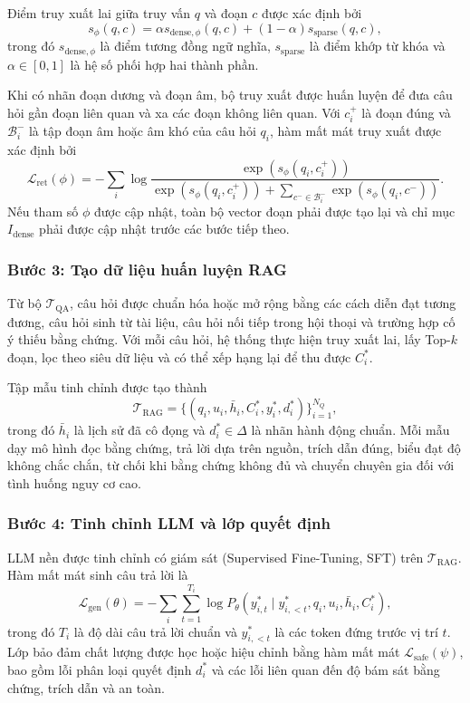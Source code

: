 Điểm truy xuất lai giữa truy vấn $q$ và đoạn $c$ được xác định bởi
\[
    s_{\phi}(q,c)
    =\alpha s_{\mathrm{dense},\phi}(q,c)
    +(1-\alpha)s_{\mathrm{sparse}}(q,c),
\]
trong đó $s_{\mathrm{dense},\phi}$ là điểm tương đồng ngữ nghĩa, $s_{\mathrm{sparse}}$ là điểm khớp từ khóa và $\alpha\in[0,1]$ là hệ số phối hợp hai thành phần.

Khi có nhãn đoạn dương và đoạn âm, bộ truy xuất được huấn luyện để đưa câu hỏi gần đoạn liên quan và xa các đoạn không liên quan. Với $c_i^+$ là đoạn đúng và $\mathcal{B}_i^-$ là tập đoạn âm hoặc âm khó của câu hỏi $q_i$, hàm mất mát truy xuất được xác định bởi \cite{karpukhin2020}
\[
    \mathcal{L}_{\mathrm{ret}}(\phi)
    =-\sum_i\log
    \frac{\exp(s_{\phi}(q_i,c_i^+))}
    {\exp(s_{\phi}(q_i,c_i^+))+
     \sum_{c^-\in\mathcal{B}_i^-}\exp(s_{\phi}(q_i,c^-))}.
\]
Nếu tham số $\phi$ được cập nhật, toàn bộ vector đoạn phải được tạo lại và chỉ mục $I_{\mathrm{dense}}$ phải được cập nhật trước các bước tiếp theo.

\subsubsection*{Bước 3: Tạo dữ liệu huấn luyện RAG}

Từ bộ $\mathcal{T}_{\mathrm{QA}}$, câu hỏi được chuẩn hóa hoặc mở rộng bằng các cách diễn đạt tương đương, câu hỏi sinh từ tài liệu, câu hỏi nối tiếp trong hội thoại và trường hợp cố ý thiếu bằng chứng. Với mỗi câu hỏi, hệ thống thực hiện truy xuất lai, lấy Top-$k$ đoạn, lọc theo siêu dữ liệu và có thể xếp hạng lại để thu được $C_i^*$.

Tập mẫu tinh chỉnh được tạo thành
\[
    \mathcal{T}_{\mathrm{RAG}}
    =\{(q_i,u_i,\bar{h}_i,C_i^*,y_i^*,d_i^*)\}_{i=1}^{N_Q},
\]
trong đó $\bar{h}_i$ là lịch sử đã cô đọng và $d_i^*\in\Delta$ là nhãn hành động chuẩn. Mỗi mẫu dạy mô hình đọc bằng chứng, trả lời dựa trên nguồn, trích dẫn đúng, biểu đạt độ không chắc chắn, từ chối khi bằng chứng không đủ và chuyển chuyên gia đối với tình huống nguy cơ cao.

\subsubsection*{Bước 4: Tinh chỉnh LLM và lớp quyết định}

LLM nền được tinh chỉnh có giám sát (Supervised Fine-Tuning, SFT) trên $\mathcal{T}_{\mathrm{RAG}}$. Hàm mất mát sinh câu trả lời là
\[
    \mathcal{L}_{\mathrm{gen}}(\theta)
    =-\sum_i\sum_{t=1}^{T_i}
    \log P_{\theta}\!\left(
        y_{i,t}^*\mid y_{i,<t}^*,q_i,u_i,\bar{h}_i,C_i^*
    \right),
\]
trong đó $T_i$ là độ dài câu trả lời chuẩn và $y_{i,<t}^*$ là các token đứng trước vị trí $t$. Lớp bảo đảm chất lượng được học hoặc hiệu chỉnh bằng hàm mất mát $\mathcal{L}_{\mathrm{safe}}(\psi)$, bao gồm lỗi phân loại quyết định $d_i^*$ và các lỗi liên quan đến độ bám sát bằng chứng, trích dẫn và an toàn.

